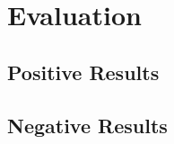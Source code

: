 \documentclass[manuscript,screen,review,anonymous]{acmart}
\begin{document}
\section{Evaluation}

\subsection{Positive Results}





\subsection{Negative Results}


\end{document}
